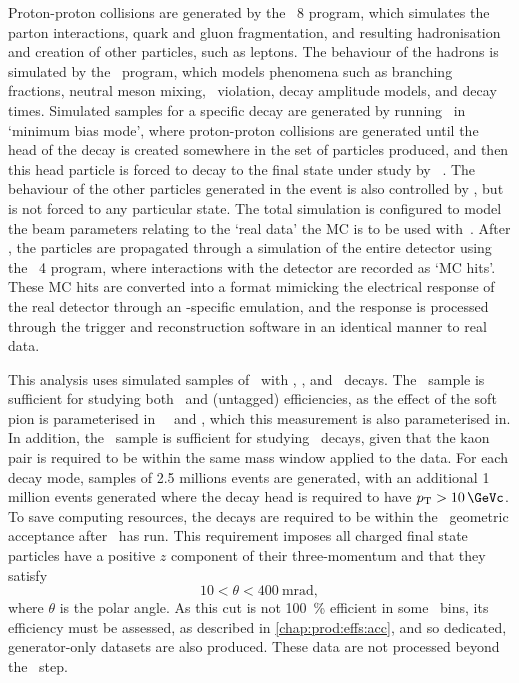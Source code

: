 Proton-proton collisions are generated by the \pythia\ 8 program, which 
simulates the parton interactions, quark and gluon fragmentation, and resulting 
hadronisation and creation of other particles, such as leptons.
The behaviour of the hadrons is simulated by the \evtgen\ program, which models 
phenomena such as branching fractions, neutral meson mixing, \CP\ violation, 
decay amplitude models, and decay times.
Simulated samples for a specific decay are generated by running \pythia\ in 
`minimum bias mode', where proton-proton collisions are generated until the 
head of the decay is created somewhere in the set of particles produced, and 
then this head particle is forced to decay to the final state under study by 
\evtgen~\cite{Clemencic:2011zza}.
The behaviour of the other particles generated in the event is also controlled 
by \evtgen, but is not forced to any particular state.
The total simulation is configured to model the beam parameters relating to the 
`real data' the \ac{MC} is to be used with~\cite{Belyaev:1322400}.
After \evtgen, the particles are propagated through a simulation of the entire 
detector using the \geant\ 4 program, where interactions with the detector are 
recorded as `\ac{MC} hits'.
These \ac{MC} hits are converted into a format mimicking the electrical 
response of the real detector through an \lhcb-specific emulation, and the 
response is processed through the trigger and reconstruction software in an 
identical manner to real data.

This analysis uses simulated samples of \DstToDzpi\ with \DzToKpi, \DpToKpipi, 
and \DspToKKpi\ decays.
The \DstToDzpi\ sample is sufficient for studying both \DstToDzpi\ and 
(untagged) \DzToKpi efficiencies, as the effect of the soft pion is 
parameterised in \PDzero\ \pT\ and \rapidity, which this measurement is also 
parameterised in.
In addition, the \DspToKKpi\ sample is sufficient for studying \DspTophipi\ 
decays, given that the kaon pair is required to be within the same mass window 
applied to the data.
For each decay mode, samples of \num{2.5} millions events are generated, with 
an additional \num{1} million events generated where the decay head is required 
to have $\pT > \SI{10}{\GeVc}$.
To save computing resources, the decays are required to be within the \lhcb\ 
geometric acceptance after \evtgen\ has run.
This requirement imposes all charged final state particles have a positive $z$ 
component of their three-momentum and that they satisfy
\begin{equation}
  10 < \theta < \SI{400}{\milli\radian},
  \label{eqn:prod:data:lhcb_acceptance}
\end{equation}
where $\theta$ is the polar angle.
As this cut is not \SI{100}{\percent} efficient in some \pTy\ bins, its 
efficiency must be assessed, as described in \cref{chap:prod:effs:acc}, and so 
dedicated, generator-only datasets are also produced.
These data are not processed beyond the \evtgen\ step.

